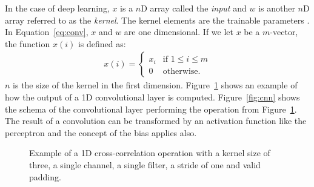 \documentclass[]{article}
\begin{document}
In the case of deep learning, $x$ is a $n$D array called the
\textit{input} and $w$ is another $n$D array referred to as the
\textit{kernel}. The kernel elements are the trainable parameters
\citep{goodfellow_et_al_2016}.
In Equation~\ref{eq:conv}, $x$ and $w$ are one dimensional.
If we let $x$ be a $m$-vector, the function $x(i)$ is defined as:
\begin{align}
  \label{eq:valid_conv}
  x(i) = \begin{cases}
    x_i &\text{if } 1 \leq i \leq m \\
    0 &\text{otherwise.}
  \end{cases}
\end{align}
$n$ is the size of the kernel in the first dimension.
Figure~\ref{fig:conv_op} shows an example of how the output of a
1D convolutional layer is computed.
Figure~\ref{fig:cnn} shows the schema of the convolutional
layer performing the operation from Figure~\ref{fig:conv_op}.
The result of a convolution can be transformed by an activation
function like the perceptron and the concept of the bias applies also.

\begin{figure} %
\begin{center}
\end{center}
\caption{Example of a 1D cross-correlation operation with a kernel
  size of three, a single channel, a single filter, a stride of one
  and valid padding.}
\label{fig:conv_op}
\end{figure} %
\end{document}
